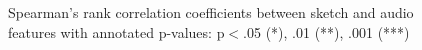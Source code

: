 \documentclass[]{interact}
\theoremstyle{plain}%
\theoremstyle{definition}
\theoremstyle{remark}
\begin{document}
 \begin{figure}[!ht]
    \hfill
    \caption{Spearman's rank correlation coefficients between sketch and audio features with annotated p-values: p$<$.05 (*), .01 (**), .001 (***)} 
    \label{fig:spearman}
  \end{figure}


\end{document}
